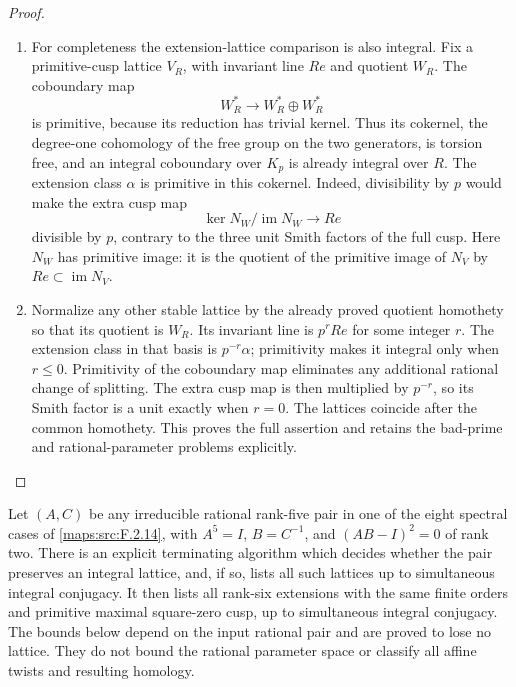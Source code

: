 \begin{proof}
\begin{enumerate}[label=\arabic*.]
\item For completeness the extension-lattice comparison is also
integral.  Fix a primitive-cusp lattice $V_R$, with invariant
line $Re$ and quotient $W_R$.
The coboundary map
\[
 W_R^*\longrightarrow W_R^*\oplus W_R^*
\]
is primitive, because its reduction has trivial kernel.
Thus its cokernel, the degree-one cohomology of the free
group on the two generators, is torsion free, and an
integral coboundary over $K_p$ is already integral over $R$.
The extension class $\alpha$ is primitive in this cokernel.
Indeed, divisibility by $p$ would make the extra cusp map
\[
 \ker N_W/\operatorname{im}N_W\longrightarrow Re
\]
divisible by $p$, contrary to the three unit Smith factors
of the full cusp.  Here $N_W$ has primitive image:
it is the quotient of the primitive image of $N_V$ by
$Re\subset\operatorname{im}N_V$.

\item Normalize any other stable lattice by the already proved
quotient homothety so that its quotient is $W_R$.
Its invariant line is $p^rRe$ for some integer $r$.
The extension class in that basis is $p^{-r}\alpha$;
primitivity makes it integral only when $r\leq0$.
Primitivity of the coboundary map eliminates any additional
rational change of splitting.  The extra cusp map is then
multiplied by $p^{-r}$, so its Smith factor is a unit exactly
when $r=0$.  The lattices coincide after the common homothety.
This proves the full assertion and retains the bad-prime
and rational-parameter problems explicitly.

\end{enumerate}
\end{proof}




\begin{theorem}\label{maps:src:F.2.22}


Let $(A,C)$ be any irreducible rational rank-five pair in
one of the eight spectral cases of \ref{maps:src:F.2.14}, with
$A^5=I$, $B=C^{-1}$, and $(AB-I)^2=0$ of rank two.
There is an explicit terminating algorithm which decides
whether the pair preserves an integral lattice, and, if so,
lists all such lattices up to simultaneous integral conjugacy.
It then lists all rank-six extensions with the same finite
orders and primitive maximal square-zero cusp, up to
simultaneous integral conjugacy.  The bounds below depend
on the input rational pair and are proved to lose no lattice.
They do not bound the rational parameter space or classify
all affine twists and resulting homology.

\end{theorem}


